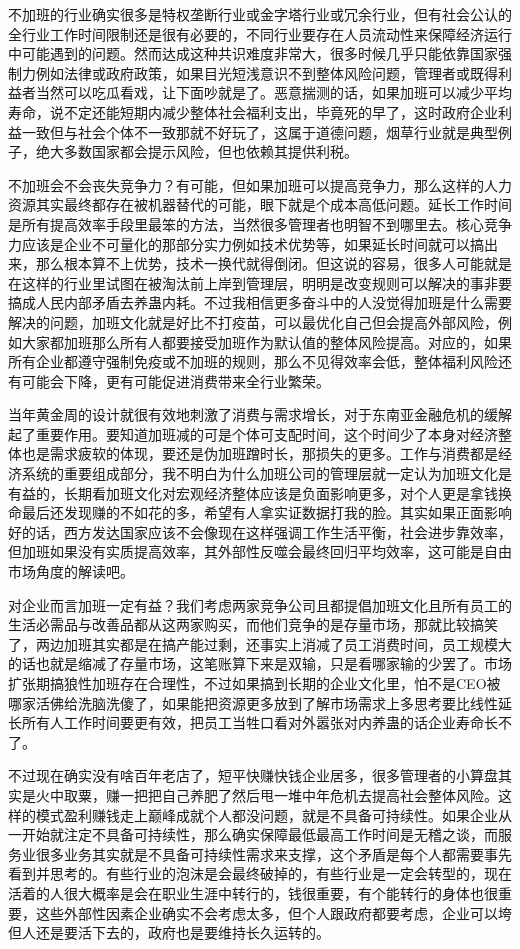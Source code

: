\documentclass[
]{book}
\begin{document}
不加班的行业确实很多是特权垄断行业或金字塔行业或冗余行业，但有社会公认的全行业工作时间限制还是很有必要的，不同行业要存在人员流动性来保障经济运行中可能遇到的问题。然而达成这种共识难度非常大，很多时候几乎只能依靠国家强制力例如法律或政府政策，如果目光短浅意识不到整体风险问题，管理者或既得利益者当然可以吃瓜看戏，让下面吵就是了。恶意揣测的话，如果加班可以减少平均寿命，说不定还能短期内减少整体社会福利支出，毕竟死的早了，这时政府企业利益一致但与社会个体不一致那就不好玩了，这属于道德问题，烟草行业就是典型例子，绝大多数国家都会提示风险，但也依赖其提供利税。

不加班会不会丧失竞争力？有可能，但如果加班可以提高竞争力，那么这样的人力资源其实最终都存在被机器替代的可能，眼下就是个成本高低问题。延长工作时间是所有提高效率手段里最笨的方法，当然很多管理者也明智不到哪里去。核心竞争力应该是企业不可量化的那部分实力例如技术优势等，如果延长时间就可以搞出来，那么根本算不上优势，技术一换代就得倒闭。但这说的容易，很多人可能就是在这样的行业里试图在被淘汰前上岸到管理层，明明是改变规则可以解决的事非要搞成人民内部矛盾去养蛊内耗。不过我相信更多奋斗中的人没觉得加班是什么需要解决的问题，加班文化就是好比不打疫苗，可以最优化自己但会提高外部风险，例如大家都加班那么所有人都要接受加班作为默认值的整体风险提高。对应的，如果所有企业都遵守强制免疫或不加班的规则，那么不见得效率会低，整体福利风险还有可能会下降，更有可能促进消费带来全行业繁荣。

当年黄金周的设计就很有效地刺激了消费与需求增长，对于东南亚金融危机的缓解起了重要作用。要知道加班减的可是个体可支配时间，这个时间少了本身对经济整体也是需求疲软的体现，要还是伪加班蹭时长，那损失的更多。工作与消费都是经济系统的重要组成部分，我不明白为什么加班公司的管理层就一定认为加班文化是有益的，长期看加班文化对宏观经济整体应该是负面影响更多，对个人更是拿钱换命最后还发现赚的不如花的多，希望有人拿实证数据打我的脸。其实如果正面影响好的话，西方发达国家应该不会像现在这样强调工作生活平衡，社会进步靠效率，但加班如果没有实质提高效率，其外部性反噬会最终回归平均效率，这可能是自由市场角度的解读吧。

对企业而言加班一定有益？我们考虑两家竞争公司且都提倡加班文化且所有员工的生活必需品与改善品都从这两家购买，而他们竞争的是存量市场，那就比较搞笑了，两边加班其实都是在搞产能过剩，还事实上消减了员工消费时间，员工规模大的话也就是缩减了存量市场，这笔账算下来是双输，只是看哪家输的少罢了。市场扩张期搞狼性加班存在合理性，不过如果搞到长期的企业文化里，怕不是CEO被哪家活佛给洗脑洗傻了，如果能把资源更多放到了解市场需求上多思考要比线性延长所有人工作时间要更有效，把员工当牲口看对外嚣张对内养蛊的话企业寿命长不了。

不过现在确实没有啥百年老店了，短平快赚快钱企业居多，很多管理者的小算盘其实是火中取粟，赚一把把自己养肥了然后甩一堆中年危机去提高社会整体风险。这样的模式盈利赚钱走上巅峰成就个人都没问题，就是不具备可持续性。如果企业从一开始就注定不具备可持续性，那么确实保障最低最高工作时间是无稽之谈，而服务业很多业务其实就是不具备可持续性需求来支撑，这个矛盾是每个人都需要事先看到并思考的。有些行业的泡沫是会最终破掉的，有些行业是一定会转型的，现在活着的人很大概率是会在职业生涯中转行的，钱很重要，有个能转行的身体也很重要，这些外部性因素企业确实不会考虑太多，但个人跟政府都要考虑，企业可以垮但人还是要活下去的，政府也是要维持长久运转的。
\end{document}
